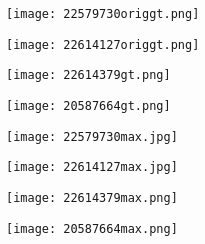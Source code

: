 \documentclass[runningheads,a4paper]{llncs}
\begin{document}
\begin{figure}[!t]
	\setlength{\abovecaptionskip}{0.cm}
	\setlength{\belowcaptionskip}{-0.cm}
	\begin{center}
		\begin{minipage}{0.15\linewidth}
			\centerline{\texttt{[image: 22579730origgt.png]}}
		\end{minipage}
		\hspace{1cm}
		\begin{minipage}{0.15\linewidth}
			\centerline{\texttt{[image: 22614127origgt.png]}}
		\end{minipage}
		\hspace{1cm}
		\begin{minipage}{0.15\linewidth}
			\centerline{\texttt{[image: 22614379gt.png]}}
		\end{minipage}
		\hspace{1cm}
		\begin{minipage}{0.15\linewidth}
			\centerline{\texttt{[image: 20587664gt.png]}}
		\end{minipage}
		\vfill
		\begin{minipage}{0.15\linewidth}
			\centerline{\texttt{[image: 22579730max.jpg]}}
		\end{minipage}
		\hspace{1cm}
		\begin{minipage}{0.15\linewidth}
			\centerline{\texttt{[image: 22614127max.jpg]}}
		\end{minipage}
		\hspace{1cm}
		\begin{minipage}{0.15\linewidth}
			\centerline{\texttt{[image: 22614379max.png]}}
		\end{minipage}
		\hspace{1cm}
		\begin{minipage}{0.15\linewidth}
			\centerline{\texttt{[image: 20587664max.png]}}
		\end{minipage}
		\vfill

\end{center}
\end{figure}
\end{document}
